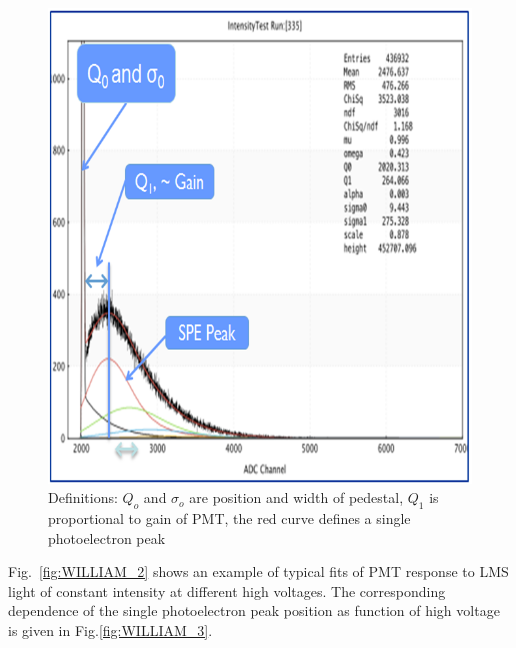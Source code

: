\begin{figure}[!h]
    \centering
    \includegraphics[width=1.0\linewidth,trim={0.0cm 0.0cm 0.0cm 0.0cm},clip]{images/WILLIAM_1.png}
    \caption{Definitions: $Q_{o}$ and $\sigma_{o}$ are position and width of pedestal, $Q_{ 1}$ is proportional to gain of PMT, the red curve defines a single photoelectron peak}
    \label{fig:WILLIAM_1}
\end{figure}

Fig.~\ref{fig:WILLIAM_2} shows an example of typical fits of PMT response to LMS light of constant intensity at different high voltages. The corresponding dependence of the single photoelectron peak position as function of high voltage is given in Fig.\ref{fig:WILLIAM_3}.

